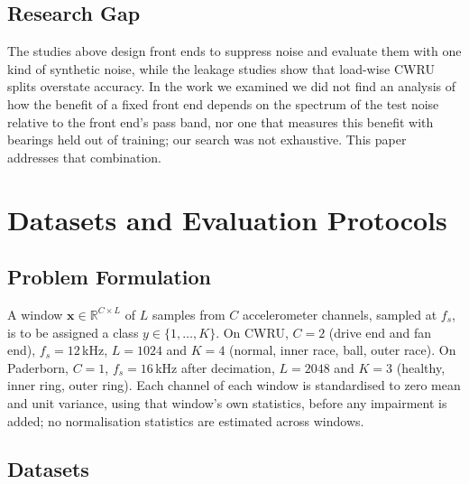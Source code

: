 \documentclass[conference]{IEEEtran}
\begin{document}
\subsection{Research Gap}
The studies above design front ends to suppress noise and evaluate them with one kind of synthetic noise, while the leakage studies show that load-wise CWRU splits overstate accuracy. In the work we examined we did not find an analysis of how the benefit of a fixed front end depends on the spectrum of the test noise relative to the front end's pass band, nor one that measures this benefit with bearings held out of training; our search was not exhaustive. This paper addresses that combination.

\section{Datasets and Evaluation Protocols}
\subsection{Problem Formulation}
A window $\mathbf{x}\in\mathbb{R}^{C\times L}$ of $L$ samples from $C$ accelerometer channels, sampled at $f_s$, is to be assigned a class $y\in\{1,\dots,K\}$. On CWRU, $C=2$ (drive end and fan end), $f_s=12$\,kHz, $L=1024$ and $K=4$ (normal, inner race, ball, outer race). On Paderborn, $C=1$, $f_s=16$\,kHz after decimation, $L=2048$ and $K=3$ (healthy, inner ring, outer ring). Each channel of each window is standardised to zero mean and unit variance, using that window's own statistics, before any impairment is added; no normalisation statistics are estimated across windows.

\subsection{Datasets}
\label{sec:data}
\end{document}
